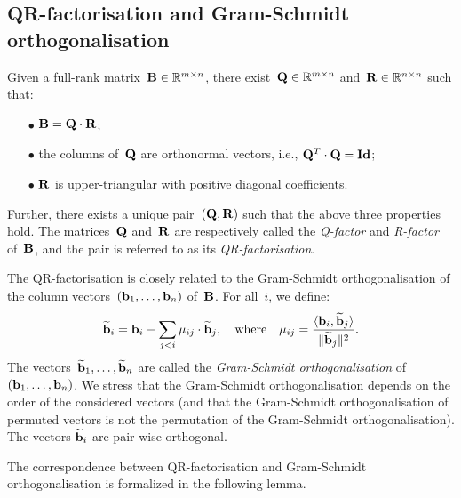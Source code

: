 


\subsection{QR-factorisation and Gram-Schmidt orthogonalisation}

Given a full-rank matrix~${\bf B} \in \mathbb{R}^{m \times n}$, there exist~${\bf Q} \in \mathbb{R}^{m \times n}$ 
and~${\bf R} \in \mathbb{R}^{n \times n}$ such that:
\begin{itemize}
\item[$\bullet$] ${\bf B} = {\bf Q} \cdot {\bf R}$;
\item[$\bullet$] the columns of~${\bf Q}$ are orthonormal vectors, i.e., ${\bf Q}^T \cdot {\bf Q} = {\bf Id}$;
\item[$\bullet$] ${\bf R}$ is upper-triangular with positive diagonal coefficients. 
\end{itemize}
Further, there exists a unique pair~$({\bf Q}, {\bf R})$ such that the above three properties hold. The matrices~${\bf Q}$ and~${\bf R}$ are respectively called the \emph{Q-factor} and \emph{R-factor} of~${\bf B}$, and the pair is referred to as its \emph{QR-factorisation}. 

The QR-factorisation is closely related to the Gram-Schmidt orthogonalisation of the column 
vectors~$({\bf b}_1,\ldots, {\bf b}_n)$ of~${\bf B}$. For all~$i$, we define:
\[
\widetilde{{\bf b}}_i = {\bf b}_i - \sum_{j <i} \mu_{ij}\cdot \widetilde{{\bf b}}_j, \ \ \mbox{ where } \ \ 
 \mu_{ij} = \frac{\ps{{\bf b}_i}{\widetilde{{\bf b}}_j}}{\|\widetilde{{\bf b}}_j\|^2}.
\]
The vectors~$\widetilde{{\bf b}}_1, \ldots, \widetilde{{\bf b}}_n$ are called the \emph{Gram-Schmidt orthogonalisation}
of~$({\bf b}_1,\ldots, {\bf b}_n)$. We stress that the Gram-Schmidt orthogonalisation depends on the order of the considered vectors
(and that the Gram-Schmidt orthogonalisation of permuted vectors is not the permutation of the Gram-Schmidt orthogonalisation). 
The vectors $\widetilde{{\bf b}}_i$ are pair-wise orthogonal. 

The correspondence between QR-factorisation and Gram-Schmidt orthogonalisation is formalized in the following lemma. 

